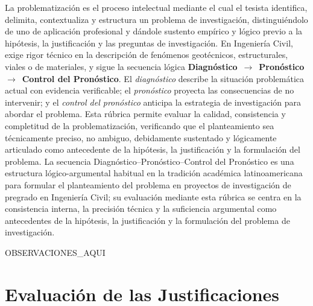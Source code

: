 \documentclass[12pt,a4paper]{report}
\begin{document}
La problematización es el proceso intelectual mediante el cual el tesista identifica, delimita, contextualiza y estructura un problema de investigación, distinguiéndolo de uno de aplicación profesional y dándole sustento empírico y lógico previo a la hipótesis, la justificación y las preguntas de investigación. En Ingeniería Civil, exige rigor técnico en la descripción de fenómenos geotécnicos, estructurales, viales o de materiales, y sigue la secuencia lógica \textbf{Diagnóstico}~$\rightarrow$~\textbf{Pronóstico}~$\rightarrow$~\textbf{Control del Pronóstico}. El \textit{diagnóstico} describe la situación problemática actual con evidencia verificable; el \textit{pronóstico} proyecta las consecuencias de no intervenir; y el \textit{control del pronóstico} anticipa la estrategia de investigación para abordar el problema. Esta rúbrica permite evaluar la calidad, consistencia y completitud de la problematización, verificando que el planteamiento sea técnicamente preciso, no ambiguo, debidamente sustentado y lógicamente articulado como antecedente de la hipótesis, la justificación y la formulación del problema. La secuencia Diagnóstico--Pronóstico--Control del Pronóstico es una estructura lógico-argumental habitual en la tradición académica latinoamericana para formular el planteamiento del problema en proyectos de investigación de pregrado en Ingeniería Civil; su evaluación mediante esta rúbrica se centra en la consistencia interna, la precisión técnica y la suficiencia argumental como antecedentes de la hipótesis, la justificación y la formulación del problema de investigación.\par



{{OBSERVACIONES_AQUI}}


\section{Evaluación de las Justificaciones}
\end{document}
